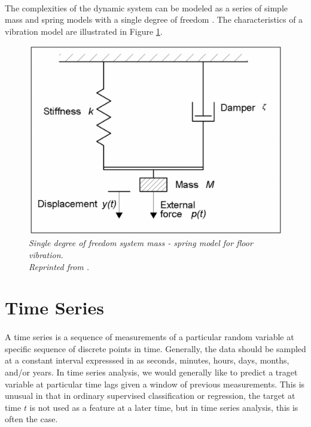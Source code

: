\paragraph{}
The complexities of the dynamic system can be modeled as a series of simple mass and spring models with a single degree of freedom \cite{p_gavin_2015}. The characteristics of a vibration model are illustrated in Figure \ref{fig:s_degree}.

\begin{figure}[H]
  \centering
  \caption[Single degree of freedom system mass - spring model for floor vibration.]{\emph{Single degree of freedom system mass - spring model for floor vibration. \\ Reprinted from \citeauthor{steelconstruction_2016} \citeyear{steelconstruction_2016}.}  }\label{fig:s_degree}
  \includegraphics[scale = 0.13]{figures/single_degree.jpg}  
\end{figure}

\section{Time Series}
\paragraph{}
A time series is a sequence of measurements of a particular random variable at specific sequence of discrete points in time. Generally, the data should be sampled at a constant interval expresssed in as seconds, minutes, hours, days, months, and/or years. In time series analysis, we would generally like to predict a traget variable at particular time lags given a window of previous measurements. This is unusual in that in ordinary supervised classification or regression, the target at time $t$ is not used as a feature at a later time, but in time series analysis, this is often the case. 

